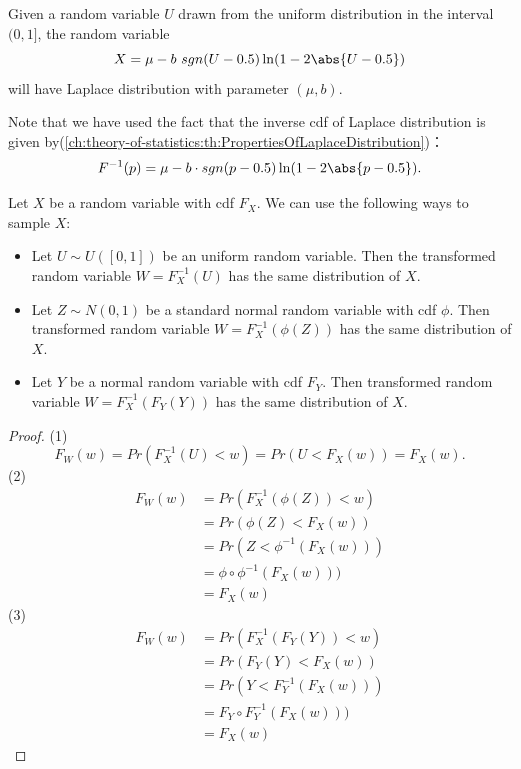 \begin{refsection}
\begin{example}
Given a random variable $U$ drawn from the uniform distribution in the interval $(0,1]$, the random variable
$$X = \mu - b~sgn(U-0.5)\ln (1-2\abs{U-0.5})$$	
will have Laplace distribution with parameter $(\mu,b)$.

Note that we have used the fact that the inverse cdf of Laplace distribution is given by(\autoref{ch:theory-of-statistics:th:PropertiesOfLaplaceDistribution})：
$$F^{-1}(p) = \mu - b\cdot sgn(p-0.5)\ln(1-2\abs{p-0.5}).$$
\end{example}

\begin{lemma}\label{ch:MonteCarlo-methods--optimization:th:GeneralizedInverseTransformMethod}
Let $X$ be a random variable with cdf $F_X$. We can use the following ways to sample $X$:
\begin{itemize}
	\item Let $U\sim U([0,1])$ be an uniform random variable. Then the transformed random variable  $W = F_X^{-1}(U)$ has the same distribution of $X$.
	\item  Let $Z\sim N(0,1)$ be a standard normal random variable with cdf $\phi$. Then transformed random variable $W=F_X^{-1}(\phi(Z))$ has the same distribution of $X$.
	\item  Let $Y$ be a normal random variable with cdf $F_Y$. Then transformed random variable $W = F_X^{-1}(F_Y(Y))$ has the same distribution of $X$.
\end{itemize}	
\end{lemma}
\begin{proof}
(1) $$F_W(w) = Pr(F_X^{-1}(U) < w) = Pr(U < F_X(w)) = F_X(w).$$
(2) 
\begin{align*}
F_W(w) &= Pr(F_X^{-1}(\phi(Z)) < w) \\
&= Pr(\phi(Z) < F_X(w))  \\
&= Pr(Z < \phi^{-1}(F_X(w))) \\
&= \phi\circ \phi^{-1}(F_X(w))) \\
&= F_X(w)
\end{align*}
(3) \begin{align*}
F_W(w) &= Pr(F_X^{-1}(F_Y(Y)) < w) \\
&= Pr(F_Y(Y) < F_X(w))  \\
&= Pr(Y < F_Y^{-1}(F_X(w))) \\
&= F_Y\circ F_Y^{-1}(F_X(w))) \\
&= F_X(w)
\end{align*}
\end{proof}


\end{refsection}
